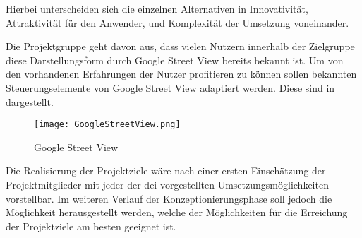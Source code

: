 Hierbei unterscheiden sich die einzelnen Alternativen in Innovativität,
Attraktivität für den Anwender, und Komplexität der Umsetzung voneinander.


Die Projektgruppe geht davon aus, dass vielen Nutzern innerhalb der Zielgruppe
diese Darstellungsform durch Google Street View bereits bekannt ist. Um von den
vorhandenen Erfahrungen der Nutzer profitieren zu können sollen bekannten
Steuerungselemente von Google Street View adaptiert werden. Diese sind in
 dargestellt.

\begin{figure}[htb] 
\centering
\texttt{[image: GoogleStreetView.png]}
\caption[Google Street View]{Google Street View\protect\footnotemark}
\label{fig:GoogleStreetView}
\end{figure}

Die Realisierung der Projektziele wäre nach einer ersten Einschätzung der
Projektmitglieder mit jeder der dei vorgestellten Umsetzungsmöglichkeiten
vorstellbar. Im weiteren Verlauf der Konzeptionierungsphase soll jedoch die
Möglichkeit herausgestellt werden, welche der Möglichkeiten für die
Erreichung der Projektziele am besten geeignet ist.
